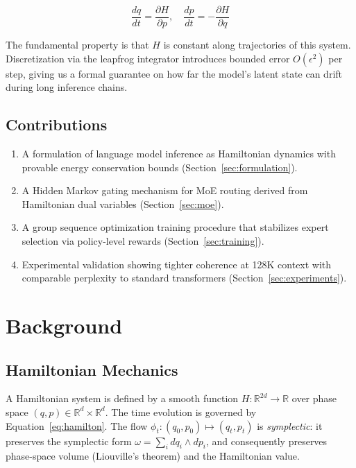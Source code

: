 \documentclass[11pt,letterpaper]{article}
\newcommand{\R}{\mathbb{R}}
\begin{document}
\begin{equation}
\frac{dq}{dt} = \frac{\partial H}{\partial p}, \quad \frac{dp}{dt} = -\frac{\partial H}{\partial q}
\label{eq:hamilton}
\end{equation}

The fundamental property is that $H$ is constant along trajectories of this system. Discretization via the leapfrog integrator introduces bounded error $O(\epsilon^2)$ per step, giving us a formal guarantee on how far the model's latent state can drift during long inference chains.

\subsection{Contributions}

\begin{enumerate}
    \item A formulation of language model inference as Hamiltonian dynamics with provable energy conservation bounds (Section~\ref{sec:formulation}).
    \item A Hidden Markov gating mechanism for MoE routing derived from Hamiltonian dual variables (Section~\ref{sec:moe}).
    \item A group sequence optimization training procedure that stabilizes expert selection via policy-level rewards (Section~\ref{sec:training}).
    \item Experimental validation showing tighter coherence at 128K context with comparable perplexity to standard transformers (Section~\ref{sec:experiments}).
\end{enumerate}

\section{Background}

\subsection{Hamiltonian Mechanics}

A Hamiltonian system is defined by a smooth function $H: \R^{2d} \to \R$ over phase space $(q, p) \in \R^d \times \R^d$. The time evolution is governed by Equation~\ref{eq:hamilton}. The flow $\phi_t: (q_0, p_0) \mapsto (q_t, p_t)$ is \emph{symplectic}: it preserves the symplectic form $\omega = \sum_i dq_i \wedge dp_i$, and consequently preserves phase-space volume (Liouville's theorem) and the Hamiltonian value.
\end{document}
